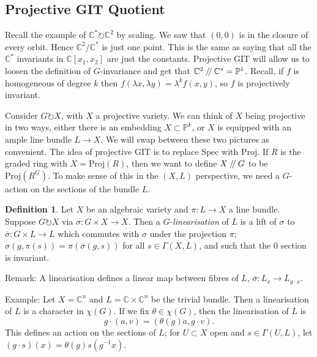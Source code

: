 \documentclass{article}
\theoremstyle{definition}
\newtheorem{defn}{Definition}
\newcommand{\C}{\mathbb{C}}
\newcommand{\bP}{\mathbb{P}}
\newcommand{\sslash}{\mathbin{/\mkern-4mu/}}
\newcommand{\Spec}{\text{Spec}}
\newcommand{\Proj}{\text{Proj}}
\begin{document}
\vspace{1em}

\subsection{Projective GIT Quotient}

Recall the example of $\C^\ast \circlearrowright \C^2$ by scaling. We saw that $(0,0)$ is in the closure of every orbit. Hence $\C^2/\C^\ast$ is just one point. This is the same as saying that all the $\C^\ast$ invariants in $\C[x_1,x_2]$ are just the constants. Projective GIT will allow us to loosen the definition of $G$-invariance and get that $\C^2\sslash \C^\ast = \bP^1$. Recall, if $f$ is homogeneous of degree $k$ then $f(\lambda x, \lambda y)= \lambda^k f(x,y)$, so $f$ is projectively invariant. \vspace{1em}

Consider $G\circlearrowright X$, with $X$ a projective variety. We can think of $X$ being projective in two ways, either there is an embedding $X\subset \bP^k$, or $X$ is equipped with an ample line bundle $L\to X$. We will swap between these two pictures as convenient. The idea of projective GIT is to replace $\Spec$ with $\Proj$. If $R$ is the graded ring with $X=\Proj(R)$, then we want to define $X\sslash G$ to be $\Proj(R^G)$. To make sense of this in the $(X,L)$ perspective, we need a $G$-action on the sections of the bundle $L$.

\begin{defn}
	Let $X$ be an algebraic variety and $\pi:L\to X$ a line bundle. Suppose $G\circlearrowright X$ via $\sigma:G\times X\to X$. Then a $G$-\emph{linearisation} of $L$ is a lift of $\sigma$ to $\overline{\sigma}:G\times L\to L$ which commutes with $\sigma$ under the projection $\pi$; $\sigma(g,\pi(s))=\pi(\overline{\sigma}(g,s))$ for all $s\in\Gamma(X,L)$, and such that the $0$ section is invariant.
\end{defn}
	Remark: A linearisation defines a linear map between fibres of $L$, $\overline{\sigma}:L_x\to L_{g\cdot x}$. \vspace{1em}
	
	Example: Let $X=\C^n$ and $L=\C\times \C^n$ be the trivial bundle. Then a linearisation of $L$ is a character in $\chi(G)$. If we fix $\theta \in \chi(G)$, then the linearisation of $L$ is 
	\begin{equation}
		g\cdot(a,v) = (\theta(g)a,g\cdot v).
	\end{equation}
	This defines an action on the sections of $L$; for $U\subset X$ open and $s\in\Gamma(U,L)$, let $(g\cdot s)(x) = \theta(g)s(g^{-1}x)$.
	\vspace{1em}
	
\end{document}
